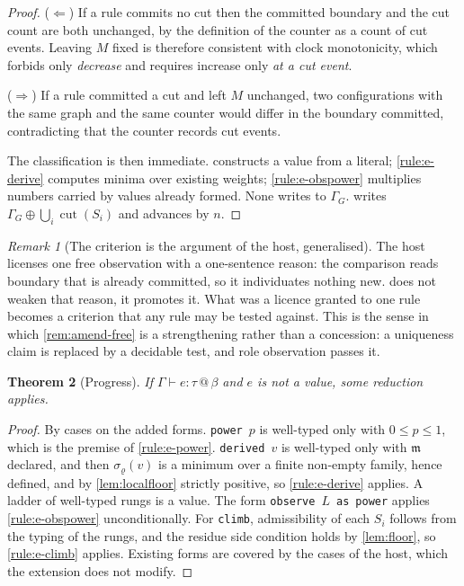 \documentclass[11pt,twocolumn,a4paper]{article}
\theoremstyle{plain}
\newtheorem{theorem}{Theorem}[section]
\theoremstyle{definition}
\theoremstyle{remark}
\newtheorem{remark}[theorem]{Remark}
\newcommand{\Gph}{\Gamma}
\newcommand{\med}{\mathfrak{m}}
\newcommand{\cut}{\operatorname{cut}}
\newcommand{\flo}{\beta}
\newcommand{\sepc}{\sigma}
\newcommand{\Lad}{L}
\newcommand{\rad}{\varrho}
\newcommand{\shk}[1]{\texttt{#1}}
\begin{document}
\begin{proof}
($\Leftarrow$) If a rule commits no cut then the committed boundary and the cut
count are both unchanged, by the definition of the counter as a count of cut
events. Leaving $M$ fixed is therefore consistent with clock monotonicity,
which forbids only \emph{decrease} and requires increase only \emph{at a cut
event}.

($\Rightarrow$) If a rule committed a cut and left $M$ unchanged, two
configurations with the same graph and the same counter would differ in the
boundary committed, contradicting that the counter records cut events.

The classification is then immediate.  constructs a value
from a literal; \cref{rule:e-derive} computes minima over existing weights;
\cref{rule:e-obspower} multiplies numbers carried by values already formed.
None writes to $\Gph_G$.  writes
$\Gph_G\oplus\bigcup_i\cut(S_i)$ and advances by $n$.
\end{proof}

\begin{remark}[The criterion is the argument of the host, generalised]
\label{rem:free-general}
The host licenses one free observation with a one-sentence reason: the
comparison reads boundary that is already committed, so it individuates nothing
new.  does not weaken that reason, it promotes it. What was a
licence granted to one rule becomes a criterion that any rule may be tested
against. This is the sense in which \cref{rem:amend-free} is a strengthening
rather than a concession: a uniqueness claim is replaced by a decidable test,
and role observation passes it.
\end{remark}

\begin{theorem}[Progress]
\label{thm:progress}
If $\Gph\vdash e:\tau\,@\,\flo$ and $e$ is not a value, some reduction applies.
\end{theorem}

\begin{proof}
By cases on the added forms. \shk{power}~$p$ is well-typed only with
$0\le p\le1$, which is the premise of \cref{rule:e-power}. \shk{derived}~$v$ is
well-typed only with $\med$ declared, and then $\sepc_\rad(v)$ is a minimum
over a finite non-empty family, hence defined, and by \cref{lem:localfloor}
strictly positive, so \cref{rule:e-derive} applies. A ladder of well-typed
rungs is a value. The form \shk{observe}~$\Lad$~\shk{as}~\shk{power} applies
\cref{rule:e-obspower} unconditionally. For \shk{climb}, admissibility of each
$S_i$ follows from the typing of the rungs, and the residue side condition
holds by \cref{lem:floor}, so \cref{rule:e-climb} applies. Existing forms are
covered by the cases of the host, which the extension does not modify.
\end{proof}
\end{document}
